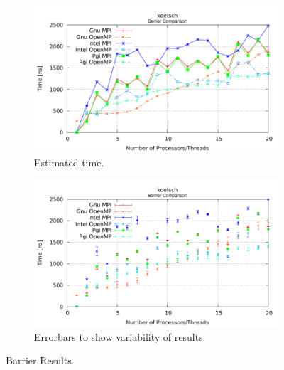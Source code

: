 \begin{figure} [t!]
    \centering
    \captionsetup{justification=centering, singlelinecheck=false}
    \begin{subfigure}{.6\textwidth}
      \centering
      \hspace*{-1.5cm} 
      \includegraphics[width=0.95\linewidth]{Plots/barrier/koelsch.pdf}
      \caption[]{Estimated time.}
      \label{fig:BarrierKoelsch}
    \end{subfigure}%
    \begin{subfigure}{.6\textwidth}
      \centering
      \hspace*{-1.5cm} 
      \includegraphics[width=0.95\linewidth]{Plots/barrier/koelschError.pdf}
      \caption{Errorbars to show variability of results.}
      \label{fig:BarrierErrorBarsKoelsch}
    \end{subfigure}
\caption{Barrier Results.}
\label{fig:BarrierAndErrorBarsForKoelsch}
\end{figure}






